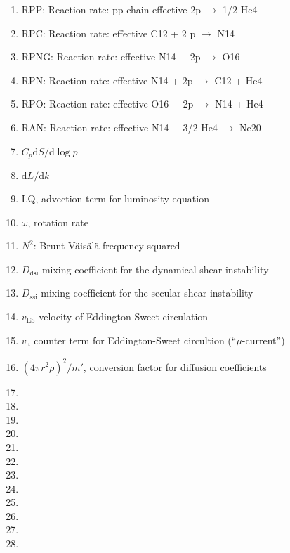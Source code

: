 \begin{enumerate}
\item RPP: Reaction rate: pp chain effective 2p $\rightarrow$ 1/2 He4
\item RPC: Reaction rate: effective C12 + 2 p $\rightarrow$ N14
\item RPNG: Reaction rate: effective N14 + 2p $\rightarrow$ O16
\item RPN: Reaction rate: effective N14 + 2p $\rightarrow$ C12 + He4
\item RPO: Reaction rate: effective O16 + 2p $\rightarrow$ N14 + He4
\item RAN: Reaction rate: effective N14 + 3/2 He4 $\rightarrow$ Ne20
\item $C_p \mathrm{d}S / \mathrm{d} \log p$
\item $\mathrm{d}L / \mathrm{d}k$
\item LQ, advection term for luminosity equation
\item $\omega$, rotation rate

\item $N^2$: Brunt-V\"ais\"al\"a frequency squared 
\item $D_\mathrm{dsi}$ mixing coefficient for the dynamical shear instability
\item $D_\mathrm{ssi}$ mixing coefficient for the secular shear instability
\item $v_\mathrm{ES}$ velocity of Eddington-Sweet circulation
\item $v_\mathrm{\mu}$ counter term for Eddington-Sweet circultion (``$\mu$-current'')
\item $(4\pi r^2 \rho)^2 / m'$, conversion factor for diffusion coefficients 
\item {}
\item {}
\item {}
\item {}

\item {}
\item {}
\item {}
\item {}
\item {}
\item {}
\item {}
\item {}
\end{enumerate}

